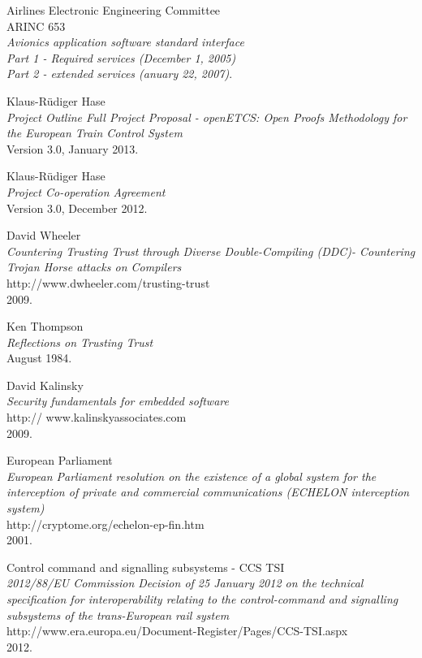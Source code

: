 \documentclass{template/openetcs_report}
\begin{document}
\begin{thebibliography}{99}
  Airlines Electronic Engineering Committee\\ARINC 653\\
  \emph{Avionics application software standard interface\\ 
Part 1 - Required services (December 1, 2005)\\
Part 2 - extended services (anuary 22, 2007)}.

  Klaus-R{\"u}diger Hase\\
  \emph{Project Outline Full Project Proposal - openETCS: Open Proofs Methodology for the European Train Control System}\\
  Version 3.0,
  January 2013.

  Klaus-R{\"u}diger Hase\\
  \emph{Project Co-operation Agreement}\\
  Version 3.0,
  December 2012.

  David Wheeler\\
  \emph{Countering Trusting Trust through Diverse Double-Compiling (DDC)- Countering Trojan Horse attacks on Compilers}\\
  http://www.dwheeler.com/trusting-trust\\
  2009.

  Ken Thompson\\
  \emph{Reflections on Trusting Trust}\\
  August 1984.

  David Kalinsky\\
  \emph{Security fundamentals for embedded software}\\
  http:// www.kalinskyassociates.com\\
  2009.

  European Parliament\\
  \emph{ European Parliament resolution on the existence of a global system for the interception of private and commercial communications (ECHELON interception system)}\\
  http://cryptome.org/echelon-ep-fin.htm\\
  2001.
  
  Control command and signalling subsystems - CCS TSI\\
  \emph{ 2012/88/EU 
  Commission Decision of 25 January 2012 on the technical specification for interoperability relating to the control-command and signalling subsystems of the trans-European rail system}\\
  http://www.era.europa.eu/Document-Register/Pages/CCS-TSI.aspx\\
  2012.  
  

\end{thebibliography}
\end{document}
